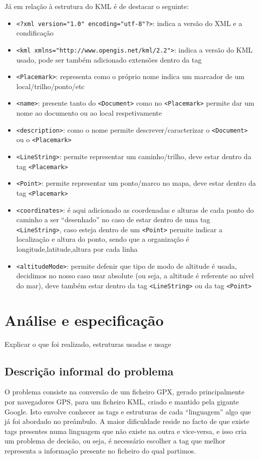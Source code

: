 \documentclass{llncs}
\begin{document}
Já em relação à estrutura do KML é de destacar o seguinte:
\begin{itemize}
    \item \verb|<?xml version="1.0" encoding="utf-8"?>|: indica a versão do XML e a condificação 
    \item \verb|<kml xmlns="http://www.opengis.net/kml/2.2">|: indica a versão do KML usado, pode ser também adicionado extensões dentro da tag
    \item \verb|<Placemark>|: representa como o próprio nome indica um marcador de um local/trilho/ponto/etc
    \item \verb|<name>|: presente tanto do \verb|<Document>| como no \verb|<Placemark>| permite dar um nome ao documento ou ao local respetivamente
    \item \verb|<description>|: como o nome permite descrever/caracterizar o \verb|<Document>| ou o \verb|<Placemark>|
    \item \verb|<LineString>|: permite representar um caminho/trilho, deve estar dentro da tag \verb|<Placemark>|
    \item \verb|<Point>|: permite representar um ponto/marco no mapa, deve estar dentro da tag \verb|<Placemark>|
    \item \verb|<coordinates>|: é aqui adicionado as coordenadas e alturas de cada ponto do caminho a ser ``desenhado'' no caso de estar dentro de uma tag \verb|<LineString>|, caso esteja dentro de um \verb|<Point>| permite indicar a localização e altura do ponto, sendo que a organização é longitude,latitude,altura por cada linha
    \item \verb|<altitudeMode>|: permite defenir que tipo de modo de altitude é usada, decidimos no nosso caso usar absolute (ou seja, a altitude é referente ao nível do mar), deve também estar dentro da tag \verb|<LineString>| ou da tag \verb|<Point>|
\end{itemize}

\section{Análise e especificação}
Explicar o que foi realizado, estruturas usadas e usage

\subsection{Descrição informal do problema}
O problema consiste na conversão de um ficheiro GPX, gerado principalmente por navegadores GPS, para um ficheiro KML, criado e mantido pela gigante Google. Isto envolve conhecer as tags e estruturas de cada ``linguagem'' algo que já foi abordado no preâmbulo. A maior dificuldade reside no facto de que existe tags presentes numa linguagem que não existe na outra e vice-versa, e isso cria um problema de decisão, ou seja, é necessário escolher a tag que melhor representa a informação presente no ficheiro do qual partimos.
\end{document}
